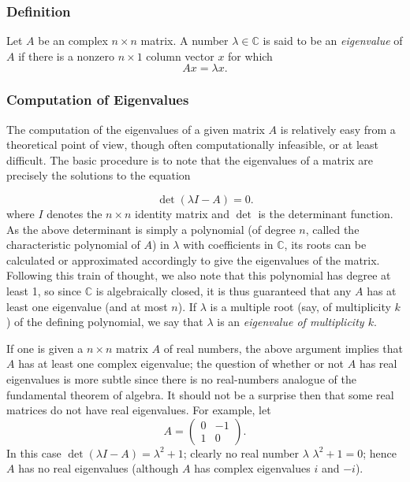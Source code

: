 \documentclass[12pt]{article}
\newcommand{\sC}[0]{\mathbb{C}}
\begin{document}
\subsubsection*{Definition}

Let $A$ be an complex $n \times n$ matrix. A number $\lambda \in \sC$ is said to be an \emph{eigenvalue} of $A$ if there is a nonzero $n \times 1$ column vector $x$ for which
 $$
 A x = \lambda x.
 $$

\subsubsection*{Computation of Eigenvalues}

The computation of the eigenvalues of a given matrix $A$ is relatively easy from a theoretical point of view, though often computationally infeasible, or at least difficult.  The basic procedure is to note that the eigenvalues of a matrix are precisely the solutions to the equation

 $$
 \det(\lambda I - A) = 0.
 $$
 where $I$ denotes the $n \times n$ identity matrix and $\det$ is the determinant function. As the above determinant is simply a polynomial (of degree $n$, called the characteristic polynomial of $A$) in $\lambda$ with coefficients in $\mathbb{C}$, its roots can be calculated or approximated accordingly to give the eigenvalues of the matrix.  Following this train of thought, we also note that this polynomial has degree at least 1, so since $\mathbb{C}$ is algebraically closed, it is thus guaranteed that any $A$ has at least one eigenvalue (and at most $n$).  If $\lambda$ is a multiple root (say, of multiplicity $k$) of the defining polynomial, we say that $\lambda$ is an \emph{eigenvalue of multiplicity $k$}.  

If one is given a $n \times n$ matrix $A$ of real numbers, the above argument implies that $A$ has at least one complex eigenvalue; the question of whether or not $A$ has real eigenvalues is more subtle since there is no real-numbers analogue of the fundamental theorem of algebra. It should not be a surprise then that some real matrices do not have real eigenvalues. For example, let
 $$
 A = \begin{pmatrix} 0 & -1 \\ 1 & 0 \end{pmatrix}.
 $$
In this case $\det(\lambda I - A) = \lambda^2 + 1$; clearly no real number $\lambda$  $\lambda^2 + 1 = 0$; hence $A$ has no real eigenvalues (although $A$ has complex eigenvalues $i$ and $-i$). 
 
\end{document}

